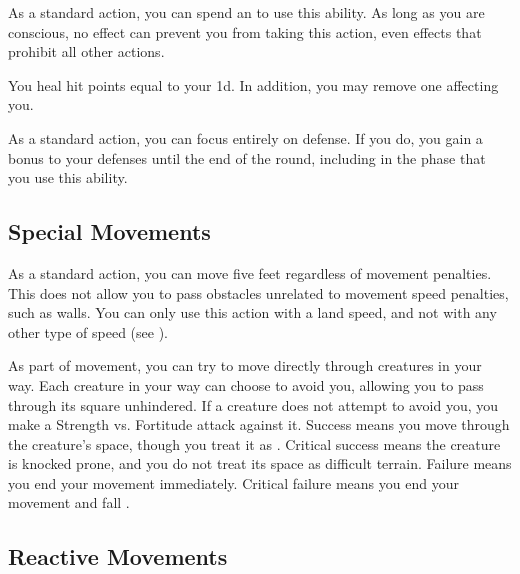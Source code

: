         \label{Recover}
        As a standard action, you can spend an  to use this ability.
        As long as you are conscious, no effect can prevent you from taking this action, even effects that prohibit all other actions.
        \begin{ability}
            \begin{spelleffects}
                \spelleffect You heal hit points equal to your  \minus1d.
                In addition, you may remove one  affecting you.
            \end{spelleffects}
        \end{ability}

        \label{Total Defense}
        As a standard action, you can focus entirely on defense.
        If you do, you gain a  bonus to your defenses until the end of the round, including in the phase that you use this ability.

    \subsection{Special Movements}

         As a standard action, you can move five feet regardless of movement penalties.
        This does not allow you to pass obstacles unrelated to movement speed penalties, such as walls.
        You can only use this action with a land speed, and not with any other type of speed (see ).

        \label{Overrun} As part of movement, you can try to move directly through creatures in your way.
        Each creature in your way can choose to avoid you, allowing you to pass through its square unhindered.
        If a creature does not attempt to avoid you, you make a Strength vs. Fortitude attack against it.
        Success means you move through the creature's space, though you treat it as .
        Critical success means the creature is knocked prone, and you do not treat its space as difficult terrain.
        Failure means you end your movement immediately.
        Critical failure means you end your movement and fall \prone.

    \subsection{Reactive Movements}

